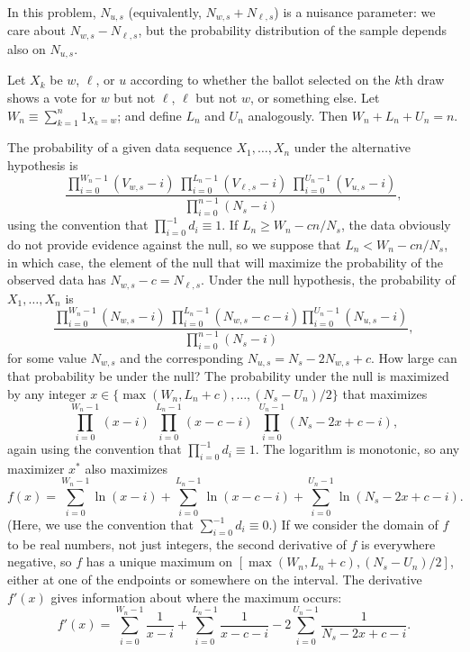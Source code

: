 \documentclass[runningheads]{llncs}
\begin{document}
In this problem, $N_{u,s}$ (equivalently, $N_{w,s} + N_{\ell,s}$) is a nuisance parameter: we care about $ N_{w,s} - N_{\ell,s}$, but the probability distribution of the sample depends also on $N_{u,s}$.

Let $X_k$ be $w$, $\ell$, or $u$ according to whether the ballot selected on the $k$th draw 
shows a vote for $w$ but not $\ell$, $\ell$ but not $w$, or something else.
Let $W_n \equiv \sum_{k=1}^n 1_{X_k = w}$; and define $L_n$ and $U_n$ analogously.
Then $W_n + L_n + U_n = n$.

The probability of a given data sequence $X_1, \ldots, X_n$ under the alternative hypothesis is
\begin{equation} \label{eq:alternative_prob}
    \frac{\prod_{i=0}^{W_n-1} (V_{w,s}-i) \; 
             \prod_{i=0}^{L_n-1} (V_{\ell,s}-i) \;
             \prod_{i=0}^{U_n-1} (V_{u,s}-i)}
            {\prod_{i=0}^{n-1} (N_s-i)},
\end{equation}
using the convention that $\prod_{i=0}^{-1} d_i \equiv 1$.
If $L_n \ge W_n - cn/N_s$, the data obviously do not provide evidence against the null, so we suppose that
$L_n < W_n - cn/N_s$, in which case, the element of the null that will maximize the probability of the observed data has $N_{w,s} - c = N_{\ell,s}$.
Under the null hypothesis, the probability of $X_1, \ldots, X_n$ is
\begin{equation} \label{eq:null_prob}
    \frac{ \prod_{i=0}^{W_n-1} (N_{w,s}-i) \;
             \prod_{i=0}^{L_n-1}(N_{w,s}-c - i)
             \prod_{i=0}^{U_n-1} (N_{u,s}-i)}
             {\prod_{i=0}^{n-1} (N_s-i)},
\end{equation}
for some value $N_{w,s}$ and the corresponding $N_{u,s} = N_s - 2N_{w,s}+c$.
How large can that probability be under the null? 
The probability under the null is maximized by any integer 
$x \in \{ \max(W_n, L_n+c), \ldots, (N_s-U_n)/2 \}$ that maximizes 
$$
\prod_{i=0}^{W_n-1} (x-i) \; \prod_{i=0}^{L_n-1} (x-c-i) \; \prod_{i=0}^{U_n-1} (N_s-2x+c - i),
$$
again using the convention that $\prod_{i=0}^{-1} d_i \equiv 1$.
The logarithm is monotonic, so any maximizer $x^*$ also maximizes
$$ f(x) = \sum_{i=0}^{W_n-1} \ln (x-i) + \sum_{i=0}^{L_n-1} \ln (x-c-i) + \sum_{i=0}^{U_n-1} \ln (N_s-2x+ c - i).$$
(Here, we use the convention that $\sum_{i=0}^{-1} d_i \equiv 0$.)
If we consider the domain of $f$ to be real numbers, not just integers, the second derivative of $f$ is everywhere negative, so $f$ has a unique maximum on $[ \max(W_n, L_n+c), (N_s-U_n)/2]$,
either at one of the endpoints or somewhere on the interval.
The derivative $f'(x)$ gives information about where the maximum occurs:
$$ f'(x) = \sum_{i=0}^{W_n-1} \frac{1}{ x-i } + \sum_{i=0}^{L_n-1} \frac{1}{ x-c-i} -2 \sum_{i=0}^{U_n-1} \frac{1}{N_s-2x+ c - i}.$$
\end{document}
